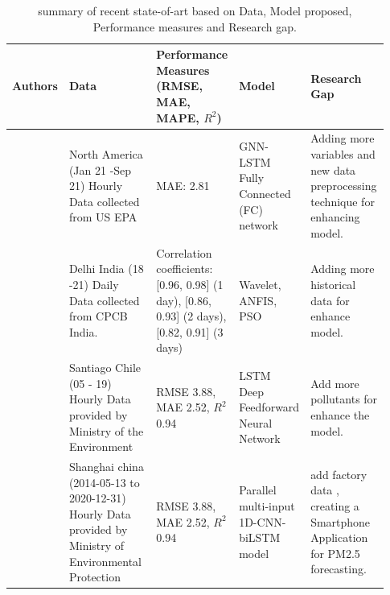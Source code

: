 \documentclass[a4paper, fleqn]{cas-sc}
\theoremstyle{definition}
\theoremstyle{remark}
\begin{document}
\begin{landscape}
  \setlength{\tabcolsep}{3pt}
  
  {\renewcommand{\arraystretch}{1}%
  \begin{longtable}[h!]{ p{0.12\linewidth} p{0.27\linewidth} p{0.16\linewidth} p{0.16\linewidth} p{0.22\linewidth} }%
  \caption{summary of recent state-of-art based on Data,  Model proposed,  Performance measures and Research gap.}
  \label{t_lr}\\
  \hline
  Authors                    & Data                                                                                                     & Performance Measures (RMSE,  MAE, MAPE,  $R^2$)                                                                    & Model                                                               & Research Gap                                                       \\ \hline
  \endhead
  \hline
  \endfoot
  \endlastfoot
  \cite{li2023nested}                & North America (Jan 21 -Sep 21)   Hourly Data collected from US EPA                                       & MAE:  2.81                                                                                               & GNN-LSTM Fully Connected (FC) network                              & Adding more variables and new data preprocessing technique for enhancing model.                                    \\
  \cite{pruthi2022low}           & Delhi  India (18 -21) Daily Data collected from   CPCB India.                                            & Correlation coefficients:  {[}0.96, 0.98{]} (1   day),  {[}0.86, 0.93{]} (2 days),  {[}0.82, 0.91{]} (3 days) & Wavelet,  ANFIS,  PSO                                                 &  Adding more historical data for enhance model.                                                  \\
  \cite{menares2021forecasting}             & Santiago Chile (05 - 19) Hourly   Data provided by Ministry of the Environment                           & RMSE 3.88,  MAE 2.52,  $R^2$ 0.94                                                                            & LSTM Deep Feedforward Neural Network                               & Add more pollutants for enhance the model.               \\
 \cite{zhu2023investigation}            & Shanghai china (2014-05-13 to 2020-12-31)   Hourly Data provided by Ministry of Environmental Protection & RMSE 3.88,  MAE 2.52,  $R^2$ 0.94                                                                            & Parallel multi-input 1D-CNN-biLSTM   model                          & add  factory data ,  creating a Smartphone Application for PM2.5 forecasting.                                                         \\




\end{longtable}}
\end{landscape}
\end{document}
